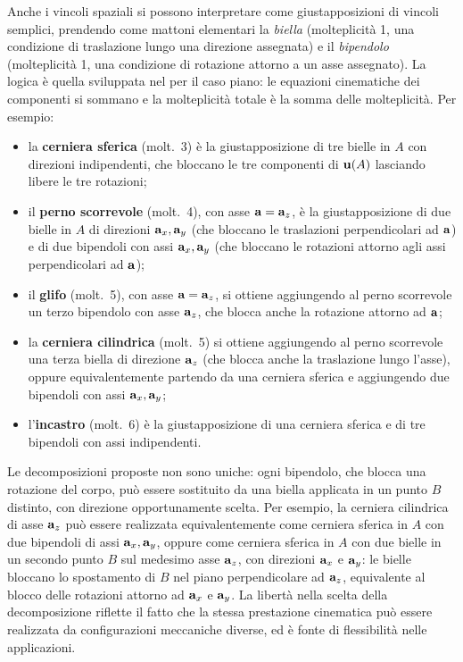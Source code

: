 \begin{oss}
	Anche i vincoli spaziali si possono interpretare come
	giustapposizioni di vincoli semplici, prendendo come
	mattoni elementari la \emph{biella} (molteplicità 1,
	una condizione di traslazione lungo una direzione
	assegnata) e il \emph{bipendolo} (molteplicità 1,
	una condizione di rotazione attorno a un asse
	assegnato). La logica è quella sviluppata nel
	 per il caso piano: le
	equazioni cinematiche dei componenti si sommano e
	la molteplicità totale è la somma delle molteplicità.
	Per esempio:
	\begin{itemize}[noitemsep]
		\item la \textbf{cerniera sferica} (molt.~3) è
		la giustapposizione di tre bielle in $A$ con
		direzioni indipendenti, che bloccano le tre
		componenti di $\mathbf{u}(A)$ lasciando libere le tre
		rotazioni;
		
		\item il \textbf{perno scorrevole} (molt.~4),
		con asse $\mathbf{a} = \mathbf{a}_z$, è la giustapposizione di
		due bielle in $A$ di direzioni $\mathbf{a}_x, \mathbf{a}_y$
		(che bloccano le traslazioni perpendicolari ad
		$\mathbf{a}$) e di due bipendoli con assi $\mathbf{a}_x, \mathbf{a}_y$
		(che bloccano le rotazioni attorno agli assi
		perpendicolari ad $\mathbf{a}$);
		
		\item il \textbf{glifo} (molt.~5), con asse $\mathbf{a} = \mathbf{a}_z$,
		si ottiene aggiungendo al perno scorrevole un terzo
		bipendolo con asse $\mathbf{a}_z$, che blocca anche la rotazione
		attorno ad $\mathbf{a}$;
		
		\item la \textbf{cerniera cilindrica} (molt.~5)
		si ottiene aggiungendo al perno scorrevole una
		terza biella di direzione $\mathbf{a}_z$ (che blocca
		anche la traslazione lungo l'asse), oppure
		equivalentemente partendo da una cerniera sferica
		e aggiungendo due bipendoli con assi $\mathbf{a}_x,
		\mathbf{a}_y$;
		
		\item l'\textbf{incastro} (molt.~6) è la
		giustapposizione di una cerniera sferica e di
		tre bipendoli con assi indipendenti.
	\end{itemize}
	
	\smallskip
	
	\noindent
	Le decomposizioni proposte non sono uniche: ogni bipendolo,
	che blocca una rotazione del corpo, può essere sostituito
	da una biella applicata in un punto $B$ distinto, con
	direzione opportunamente scelta. Per esempio, la cerniera
	cilindrica di asse $\mathbf{a}_z$ può essere realizzata
	equivalentemente come cerniera sferica in $A$ con due
	bipendoli di assi $\mathbf{a}_x, \mathbf{a}_y$, oppure come cerniera
	sferica in $A$ con due bielle in un secondo punto $B$ sul
	medesimo asse $\mathbf{a}_z$, con direzioni $\mathbf{a}_x$ e $\mathbf{a}_y$:
	le bielle bloccano lo spostamento di $B$ nel piano
	perpendicolare ad $\mathbf{a}_z$, equivalente al blocco delle
	rotazioni attorno ad $\mathbf{a}_x$ e $\mathbf{a}_y$. La libertà nella
	scelta della decomposizione riflette il fatto che la stessa
	prestazione cinematica può essere realizzata da
	configurazioni meccaniche diverse, ed è fonte di
	flessibilità nelle applicazioni.
	

\end{oss}
